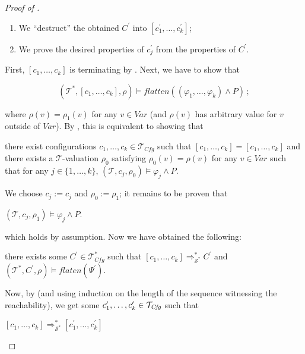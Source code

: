 \begin{proof}[Proof of ]
\begin{enumerate}
\begin{enumerate}
\begin{enumerate}
        \end{enumerate}
        \item We ``destruct'' the obtained $C^\prime$ into $[c^\prime_1,\ldots,c^\prime_k]$;
        \item We prove the desired properties of $c^\prime_j$ from the properties of $C^\prime$.
    \end{enumerate}
    First, $[c_1,\ldots,c_k]$ is terminating by .
    Next, we have to show that
    \begin{proofenv}
        \begin{equation*}
            (\mathcal{T}^*, [c_1,\ldots,c_k], \rho) \vDash \mathit{flatten}((\varphi_1,\ldots,\varphi_k) \land P) \, ;
        \end{equation*}
    \end{proofenv}
    where $\rho(v) = \rho_1(v)$ for any $v \in \mathit{Var}$ (and $\rho(v)$ has arbitrary value for $v$ outside of $\mathit{Var}$).
    By , this is equivalent to showing that
    \begin{proofenv}
        there exist configurations $c_1, \ldots, c_k \in \mathcal{T}_{\mathit{Cfg}}$ such that
        $[c_1, \ldots, c_k] = [c_1, \ldots, c_k]$ and there exists a $\mathcal{T}$-valuation $\rho_0$
        satisfying $\rho_0(v) = \rho(v)$ for any $v \in \mathit{Var}$
        such that for any $j \in \{ 1, \ldots, k \}$, $(\mathcal{T}, c_j, \rho_0) \vDash \varphi_j \land P$.
    \end{proofenv}
    We choose $c_j := c_j$ and $\rho_0 := \rho_1$; it remains to be proven that
    \begin{proofenv}
        $(\mathcal{T}, c_j, \rho_1) \vDash \varphi_j \land P$.    
    \end{proofenv}
    which holds by assumption.
    Now we have obtained the following:
    \begin{proofenv}
        there exists some $C^\prime \in \mathcal{T}_{\mathit{Cfg}}^*$ such that
        $[c_1,\ldots,c_k] \Rightarrow_{\mathcal{S}^*}^* C^\prime$
        and $(\mathcal{T}^*, C^\prime, \rho) \vDash \mathit{flaten}(\Psi^\prime)$.
    \end{proofenv}
    Now, by  (and using induction on the length of the
    sequence witnessing the reachability),
    we get some $c^\prime_1,\ldots,c^\prime_k \in \mathcal{T}_{\mathit{Cfg}}$ such that
    \begin{proofenv}
        $[c_1,\ldots,c_k] \Rightarrow_{\mathcal{S}^*}^* [c^\prime_1,\ldots,c^\prime_k]$

\end{proofenv}
\end{enumerate}
\end{proof}

